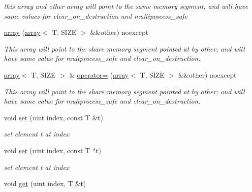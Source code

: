 \begin{DoxyCompactItemize}
\begin{DoxyCompactList}\small\item\em this array and other array will point to the same memory segment, and will have same values for clear\+\_\+on\+\_\+destruction and multiprocess\+\_\+safe \end{DoxyCompactList}\item 
\hyperlink{classshared__memory_1_1array_af399f2f20d16dadf8381c61ea5ad42fd}{array} (\hyperlink{classshared__memory_1_1array}{array}$<$ T, S\+I\+ZE $>$ \&\&other) noexcept
\begin{DoxyCompactList}\small\item\em This array will point to the share memory segment pointed at by other; and will have same value for multprocess\+\_\+safe and clear\+\_\+on\+\_\+destruction. \end{DoxyCompactList}\item 
\hyperlink{classshared__memory_1_1array}{array}$<$ T, S\+I\+ZE $>$ \& \hyperlink{classshared__memory_1_1array_ad5b4b2841b2785b188a6371cb7f00f1f}{operator=} (\hyperlink{classshared__memory_1_1array}{array}$<$ T, S\+I\+ZE $>$ \&\&other) noexcept
\begin{DoxyCompactList}\small\item\em This array will point to the share memory segment pointed at by other; and will have same value for multprocess\+\_\+safe and clear\+\_\+on\+\_\+destruction. \end{DoxyCompactList}\item 
void \hyperlink{classshared__memory_1_1array_ac413bc76d199bb52a0f95faff7222f37}{set} (uint index, const T \&t)\hypertarget{classshared__memory_1_1array_ac413bc76d199bb52a0f95faff7222f37}{}\label{classshared__memory_1_1array_ac413bc76d199bb52a0f95faff7222f37}

\begin{DoxyCompactList}\small\item\em set element t at index \end{DoxyCompactList}\item 
void \hyperlink{classshared__memory_1_1array_ae581f4ffcf1e543032e0128be5da181d}{set} (uint index, const T $\ast$t)\hypertarget{classshared__memory_1_1array_ae581f4ffcf1e543032e0128be5da181d}{}\label{classshared__memory_1_1array_ae581f4ffcf1e543032e0128be5da181d}

\begin{DoxyCompactList}\small\item\em set element t at index \end{DoxyCompactList}\item 
void \hyperlink{classshared__memory_1_1array_ae16ed72c9590631e608de8bacf1368ba}{get} (uint index, T \&t)\hypertarget{classshared__memory_1_1array_ae16ed72c9590631e608de8bacf1368ba}{}\label{classshared__memory_1_1array_ae16ed72c9590631e608de8bacf1368ba}


\end{DoxyCompactItemize}
